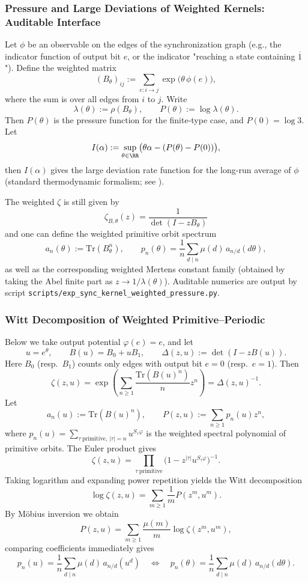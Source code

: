 \subsubsection{Pressure and Large Deviations of Weighted Kernels: Auditable Interface}\label{subsubsec:sync-kernel-weighted-pressure-ldp}
Let $\phi$ be an observable on the edges of the synchronization graph (e.g., the indicator function of output bit $e$, or the indicator "reaching a state containing $\overline{1}$"). Define the weighted matrix
\[
(B_\theta)_{ij}:=\sum_{e:i\to j}\exp\bigl(\theta\,\phi(e)\bigr),
\]
where the sum is over all edges from $i$ to $j$. Write
\[
\lambda(\theta):=\rho(B_\theta),\qquad P(\theta):=\log\lambda(\theta).
\]
Then $P(\theta)$ is the pressure function for the finite-type case, and $P(0)=\log 3$. Let
\[
I(\alpha):=\sup_{\theta\in\RR}\bigl(\theta\alpha-(P(\theta)-P(0))\bigr),
\]
then $I(\alpha)$ gives the large deviation rate function for the long-run average of $\phi$ (standard thermodynamic formalism; see \cite{Ruelle1978Thermodynamic,ParryPollicott1990Zeta}).

The weighted $\zeta$ is still given by
\[
\zeta_{B,\theta}(z)=\frac{1}{\det(I-zB_\theta)}
\]
and one can define the weighted primitive orbit spectrum
\[
a_n(\theta):=\mathrm{Tr}(B_\theta^n),\qquad
p_n(\theta)=\frac{1}{n}\sum_{d\mid n}\mu(d)\,a_{n/d}(d\theta),
\]
as well as the corresponding weighted Mertens constant family (obtained by taking the Abel finite part as $z\to 1/\lambda(\theta)$).
Auditable numerics are output by script \texttt{scripts/exp\_sync\_kernel\_weighted\_pressure.py}.

\subsubsection{Witt Decomposition of Weighted Primitive--Periodic}\label{app:witt-weighted}
Below we take output potential $\varphi(e)=e$, and let
\[
u=e^\theta,\qquad B(u)=B_0+uB_1,\qquad \Delta(z,u):=\det(I-zB(u)).
\]
Here $B_0$ (resp.\ $B_1$) counts only edges with output bit $e=0$ (resp.\ $e=1$).
Then
\[
\zeta(z,u)=\exp\!\left(\sum_{n\ge 1}\frac{\mathrm{Tr}(B(u)^n)}{n}z^n\right)=\Delta(z,u)^{-1}.
\]
Let
\[
a_n(u):=\mathrm{Tr}(B(u)^n),\qquad
P(z,u):=\sum_{n\ge 1}p_n(u)z^n,
\]
where
\(
p_n(u)=\sum_{\tau\ \mathrm{primitive},\,|\tau|=n}u^{S_\tau\varphi}
\)
is the weighted spectral polynomial of primitive orbits. The Euler product gives
\[
\zeta(z,u)=\prod_{\tau\ \mathrm{primitive}}\bigl(1-z^{|\tau|}u^{S_\tau\varphi}\bigr)^{-1}.
\]
Taking logarithm and expanding power repetition yields the Witt decomposition
\[
\log\zeta(z,u)=\sum_{m\ge 1}\frac{1}{m}P(z^m,u^m).
\]
By Möbius inversion we obtain
\[
P(z,u)=\sum_{m\ge 1}\frac{\mu(m)}{m}\log\zeta(z^m,u^m),
\]
comparing coefficients immediately gives
\[
p_n(u)=\frac{1}{n}\sum_{d\mid n}\mu(d)\,a_{n/d}(u^d)
\quad\Longleftrightarrow\quad
p_n(\theta)=\frac{1}{n}\sum_{d\mid n}\mu(d)\,a_{n/d}(d\theta).
\]


